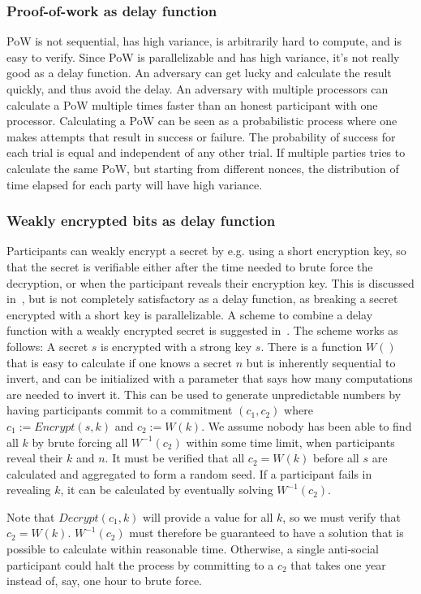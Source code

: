 \subsubsection{Proof-of-work as delay function}
PoW is not sequential, has high variance, is arbitrarily hard to compute, and is easy to verify. Since PoW is parallelizable and has high variance, it's not really good as a delay function. An adversary can get lucky and calculate the result quickly, and thus avoid the delay. An adversary with multiple processors can calculate a PoW multiple times faster than an honest participant with one processor. Calculating a PoW can be seen as a probabilistic process where one makes attempts that result in success or failure. The probability of success for each trial is equal and independent of any other trial. If multiple parties tries to calculate the same PoW, but starting from different nonces, the distribution of time elapsed for each party will have high variance.  

\subsubsection{Weakly encrypted bits as delay function}
Participants can weakly encrypt a secret by e.g. using a short encryption key, so that the secret is verifiable either after the time needed to brute force the decryption, or when the participant reveals their encryption key.
This is discussed in~\cite{syverson_weakly_1998}, but is not completely satisfactory as a delay function, as breaking a secret encrypted with a short key is parallelizable. 
A scheme to combine a delay function with a weakly encrypted secret is suggested in~\cite{rivest_time-lock_1996}. The scheme works as follows: A secret $s$ is encrypted with a strong key $s$. There is a function $W()$ that is easy to calculate if one knows a secret $n$ but is inherently sequential to invert, and can be initialized with a parameter that says how many computations are needed to invert it.
This can be used to generate unpredictable numbers by having participants commit to a commitment $(c_1, c_2)$ where $c_1:=Encrypt(s, k)$ and $c_2:=W(k)$. We assume nobody has been able to find all $k$ by brute forcing all $W^{-1}(c_2)$ within some time limit, when participants reveal their $k$ and $n$. It must be verified that all $c_2=W(k)$ before all $s$ are calculated and aggregated to form a random seed. If a participant fails in revealing $k$, it can be calculated by eventually solving $W^{-1}(c_2)$.

Note that $Decrypt(c_1, k)$ will provide a value for all $k$, so we must verify that $c_2=W(k)$. $W^{-1}(c_2)$ must therefore be guaranteed to have a solution that is possible to calculate within reasonable time. Otherwise, a single anti-social participant could halt the process by committing to a $c_2$ that takes one year instead of, say, one hour to brute force. 


